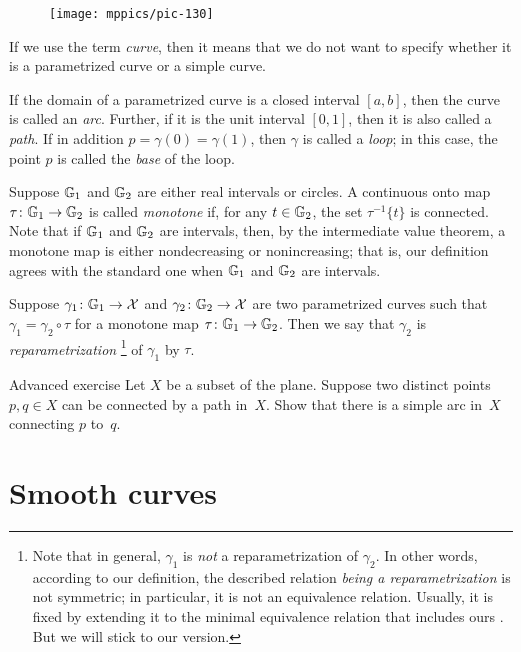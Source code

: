 \begin{wrapfigure}{o}{15 mm}
\vskip-3mm
\centering
\texttt{[image: mppics/pic-130]}
\end{wrapfigure}

If we use the term \emph{curve}, then it means that we do not want to specify whether it is a parametrized curve or a simple curve.

If the domain of a parametrized curve is a closed interval $[a,b]$, then the curve is called an \emph{arc}.
Further, if it is the unit interval $[0,1]$, then it is also called a \emph{path}.
If in addition $p=\gamma(0)=\gamma(1)$, then $\gamma$ is called a \emph{loop};
in this case, the point $p$ is called the \emph{base} of the loop.

Suppose $\mathbb{G}_1$ and $\mathbb{G}_2$ are either real intervals or circles.
A continuous onto map $\tau\colon\mathbb{G}_1\to\mathbb{G}_2$ is called \emph{monotone} if, for any $t\in \mathbb{G}_2$, the set $\tau^{-1}\{t\}$ is connected.
Note that if $\mathbb{G}_1$ and $\mathbb{G}_2$ are intervals, then, by the intermediate value theorem, a monotone map is either nondecreasing or nonincreasing;
that is, our definition agrees with the standard one when $\mathbb{G}_1$ and $\mathbb{G}_2$ are intervals.

Suppose $\gamma_1\colon\mathbb{G}_1\to \mathcal{X}$ and $\gamma_2\colon\mathbb{G}_2\to \mathcal{X}$ are two parametrized curves such that 
$\gamma_1=\gamma_2\circ\tau$ for a monotone map $\tau\colon\mathbb{G}_1\to\mathbb{G}_2$.
Then we say that $\gamma_2$ is \emph{reparametrization}%
\footnote{Note that in general, $\gamma_1$ is {}\emph{not} a reparametrization of $\gamma_2$.
In other words, according to our definition, the described relation {}\emph{being a reparametrization} is not symmetric;
in particular, it is not an equivalence relation.
Usually, it is fixed by extending it to the minimal equivalence relation that includes ours \cite[2.5.1]{burago-burago-ivanov}.
But we will stick to our version.}
of $\gamma_1$ by $\tau$.


\begin{thm}{Advanced exercise}\label{aex:simple-curve}
Let $X$ be a subset of the plane.
Suppose two distinct points $p,q\in X$ can be connected by a path in~$X$.
Show that there is a simple arc in~$X$ connecting $p$ to~$q$.
\end{thm}

\section{Smooth curves}

